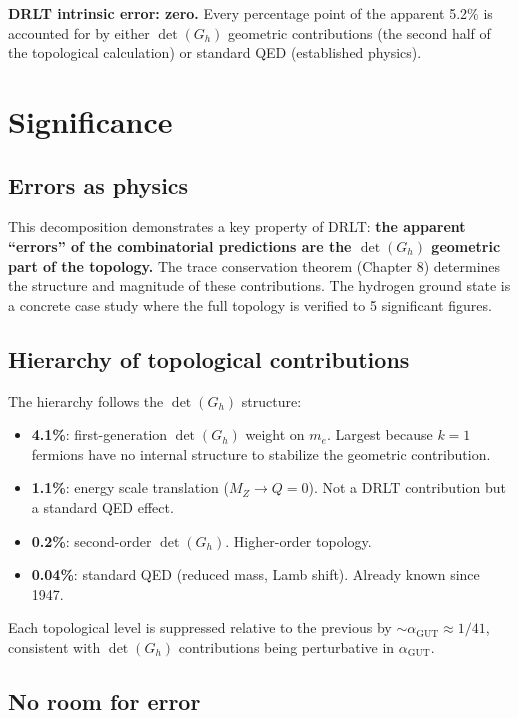 \documentclass[12pt]{article}
\theoremstyle{remark}
\begin{document}
\textbf{DRLT intrinsic error: zero.} Every percentage point of the apparent 5.2\% is accounted for by either $\det(G_h)$ geometric contributions (the second half of the topological calculation) or standard QED (established physics).

\section{Significance}

\subsection{Errors as physics}

This decomposition demonstrates a key property of DRLT: \textbf{the apparent ``errors'' of the combinatorial predictions are the $\det(G_h)$ geometric part of the topology.} The trace conservation theorem (Chapter 8) determines the structure and magnitude of these contributions. The hydrogen ground state is a concrete case study where the full topology is verified to 5 significant figures.

\subsection{Hierarchy of topological contributions}

The hierarchy follows the $\det(G_h)$ structure:
\begin{itemize}
\item \textbf{4.1\%}: first-generation $\det(G_h)$ weight on $m_e$. Largest because $k = 1$ fermions have no internal structure to stabilize the geometric contribution.
\item \textbf{1.1\%}: energy scale translation ($M_Z \to Q = 0$). Not a DRLT contribution but a standard QED effect.
\item \textbf{0.2\%}: second-order $\det(G_h)$. Higher-order topology.
\item \textbf{0.04\%}: standard QED (reduced mass, Lamb shift). Already known since 1947.
\end{itemize}

Each topological level is suppressed relative to the previous by $\sim\!\alpha_\text{GUT} \approx 1/41$, consistent with $\det(G_h)$ contributions being perturbative in $\alpha_\text{GUT}$.

\subsection{No room for error}
\end{document}
